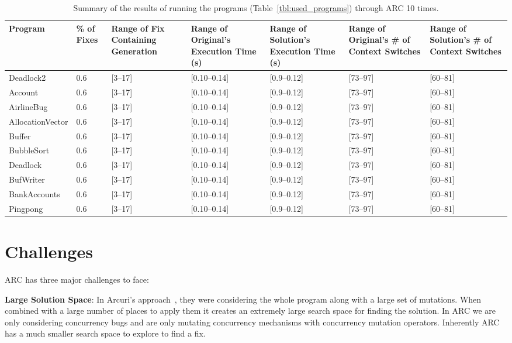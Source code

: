 \documentclass[10pt, conference, compsocconf]{IEEEtran}
\begin{document}
\begin{table}[!t]
\begin{center}
\begin{tabular}{|p{2cm}|p{0.6cm}|p{1.75cm}|p{2cm}|p{2cm}|p{2cm}|p{2cm}|}
\hline
\textbf{Program} &
\textbf{\% of Fixes} &
\textbf{Range of Fix Containing Generation} &
\textbf{Range of Original's Execution Time (s)} &
\textbf{Range of Solution's Execution Time (s)} &
\textbf{Range of Original's \# of Context Switches} &
\textbf{Range of Solution's \# of Context Switches}
\\\hline
Deadlock2 & 0.6 & [3--17] & [0.10--0.14] & [0.9--0.12] & [73--97] & [60--81]
\\\hline
Account & 0.6 & [3--17] & [0.10--0.14] & [0.9--0.12] & [73--97] & [60--81]
\\\hline
AirlineBug & 0.6 & [3--17] & [0.10--0.14] & [0.9--0.12] & [73--97] & [60--81]
\\\hline
AllocationVector & 0.6 & [3--17] & [0.10--0.14] & [0.9--0.12] & [73--97] & [60--81]
\\\hline
Buffer & 0.6 & [3--17] & [0.10--0.14] & [0.9--0.12] & [73--97] & [60--81]
\\\hline
BubbleSort & 0.6 & [3--17] & [0.10--0.14] & [0.9--0.12] & [73--97] & [60--81]
\\\hline
Deadlock & 0.6 & [3--17] & [0.10--0.14] & [0.9--0.12] & [73--97] & [60--81]
\\\hline
BufWriter & 0.6 & [3--17] & [0.10--0.14] & [0.9--0.12] & [73--97] & [60--81]
\\\hline
BankAccounts & 0.6 & [3--17] & [0.10--0.14] & [0.9--0.12] & [73--97] & [60--81]
\\\hline
Pingpong & 0.6 & [3--17] & [0.10--0.14] & [0.9--0.12] & [73--97] & [60--81]
\\\hline
\end{tabular}
\caption{Summary of the results of running the programs (Table~\ref{tbl:used_programs}) through ARC 10 times.}
\label{tbl:summary_results}
\end{center}
\end{table}


\section{Challenges}
\label{sec:challenges}

ARC has three major challenges to face:

\textbf{Large Solution Space}: In Arcuri's approach~\cite{AY08}, they were
considering the whole program along with a large set of mutations. When combined with a large number of places to apply them it creates an extremely large search space for finding the solution. In ARC we are only considering concurrency bugs and are only mutating concurrency mechanisms with concurrency mutation operators. Inherently ARC has a much smaller search space to explore to find a fix.
\end{document}
